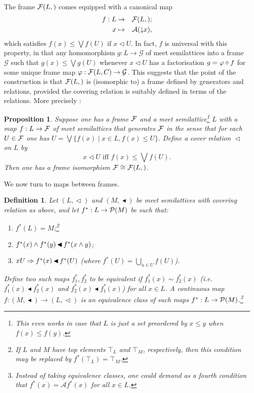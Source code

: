 \documentclass[12pt]{article}
\newcommand{\downset}{\ensuremath{\mathop{\downarrow\!}}}
\newcommand{\drie}{\vartriangleleft}
\newcommand{\coveredd}{\ensuremath{\mathop{\blacktriangleleft}}}
\newcommand{\beq}{\begin{equation}}
\newcommand{\eeq}{\end{equation}}
\newcommand{\raw}{\rightarrow} \newcommand{\rat}{\mapsto}
\newcommand{\ie}{\textit{i.e.}}
\newtheorem{proposition}[theorem]{Proposition}
\newtheorem{definition}[theorem]{Definition}
\begin{document}
 The frame $\CF(L,\drie)$ comes equipped with a canonical map 
 \begin{eqnarray}
 f:L& \raw & \CF(L,\drie) ; \\
  x&\mapsto&  \mathcal{A}(\downset x), \label{canmap}
\end{eqnarray}
which satisfies
 $f(x)\leqslant \bigvee f(U) \mbox{ if } x\drie U$.
 In fact, $f$ is universal with this property, in that any homomorphism $g:L\raw \mathcal{G}$ of meet semilattices into a frame $\mathcal{G}$ such that $g(x)\leqslant \bigvee g(U)$ whenever $x\drie U$
has  a factorisation $g=\varphi\circ f$ for some unique frame map $\phv: \CF(L,C)\raw \mathcal{G}$.
This suggests that the point of the construction is that  $\CF(L,\drie)$ is (isomorphic to)
a frame defined by generators and relations, provided the covering relation is suitably defined in terms 
of the relations. More precisely \cite[Thm.\ 12]{aczel}:
\begin{proposition}\label{preciseprop}
Suppose one has a frame ${\mathcal F}$ and a meet semilattice\footnote{This even works  in case that $L$ is just a set preordered by $x\leqslant y$ when $f(x)\leqslant f(y)$.} $L$ with a map $f:L\raw \CF$ of meet semilattices
that generates ${\mathcal F}$ in the sense that for each $U\in{\mathcal F}$ one has $U=\bigvee\{f(x)\mid x\in L, f(x)\leq U\}$.
Define a cover relation $\drie$ on $L$ by
\beq  x\drie U \mbox{ iff }  f(x)\leqslant \bigvee f(U). \label{unicover}
\eeq
Then one has a frame isomorphism $\CF\cong \CF(L,\drie)$.
\end{proposition}

We now turn to maps between frames.
\begin{definition}\label{def:contmap}
Let $(L,\drie)$ and $(M,\coveredd)$ be meet semilattices with covering relation as above,
and let $f^*:L\raw\CP(M)$ be such that:
\begin{enumerate}
\item $f^*(L)=M$;\footnote{If $L$ and $M$ have top elements $\top_L$ and $\top_M$, respectively, then this condition may be replaced by $f^*(\top_L)=\top_M$.}
\item $f^*(x)\wed f^*(y)\coveredd f^*(x\wed y)$;
\item  $x\drie U\Raw f^*(x)\coveredd f^*(U)$ (where $f^*(U)=\bigcup_{u\in U} f(U)$).
\end{enumerate}
 
Define two such maps $f^*_1, f^*_2$ to be equivalent if $f^*_1(x) \sim f^*_2(x)$ (\ie\ 
$f^*_1(x) \coveredd f^*_2(x)$ and $f^*_2(x) \coveredd f^*_1(x)$)
for all $x \in L$. A
 \textit{continuous map} $f:(M,\coveredd) \raw (L,\drie)$ is an equivalence class of such maps
$f^*:L\raw\CP(M)$.\footnote{
Instead of taking equivalence classes, one could demand as a fourth
condition that $f^*(x) = \mathcal{A}f^*(x)$ for all $x \in L$.}
\end{definition}
\end{document}
